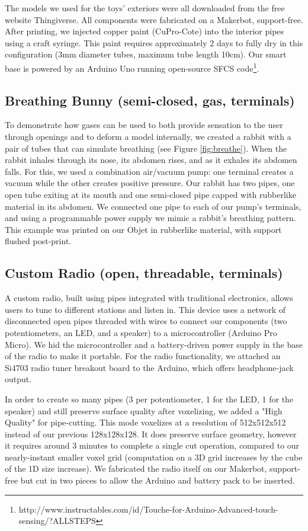 The models we used for the toys' exteriors were all downloaded from the free website Thingiverse.  All components were fabricated on a Makerbot, support-free.  After printing, we injected copper paint (CuPro-Cote) into the interior pipes using a craft syringe.  This paint requires approximately 2 days to fully dry in this configuration (3mm diameter tubes, maximum tube length 10cm).  Our smart base is powered by an Arduino Uno running open-source SFCS code\footnote{http://www.instructables.com/id/Touche-for-Arduino-Advanced-touch-sensing/?ALLSTEPS}.

\subsection{Breathing Bunny (semi-closed, gas, terminals)}

To demonstrate how gases can be used to both provide sensation to the user through openings and to deform a model internally, we created a rabbit with a pair of tubes that can simulate breathing (see Figure \ref{fig:breathe}).  When the rabbit inhales through its nose, its abdomen rises, and as it exhales its abdomen falls.  For this, we used a combination air/vacuum pump: one terminal creates a vacuum while the other creates positive pressure.  Our rabbit has two pipes, one open tube exiting at its mouth and one semi-closed pipe capped with rubberlike material in its abdomen.  We connected one pipe to each of our pump's terminals, and using a programmable power supply we mimic a rabbit's breathing pattern.  This example was printed on our Objet in rubberlike material, with support flushed post-print.

\subsection{Custom Radio (open, threadable, terminals)}

A custom radio, built using pipes integrated with traditional electronics, allows users to tune to different stations and listen in.  This device uses a network of disconnected open pipes threaded with wires to connect our components (two potentiometers, an LED, and a speaker) to a microcontroller (Arduino Pro Micro). We hid the microcontroller and a battery-driven power supply in the base of the radio to make it portable.  For the radio functionality, we attached an Si4703 radio tuner breakout board to the Arduino, which offers headphone-jack output.

In order to create so many pipes (3 per potentiometer, 1 for the LED, 1 for the speaker) and still preserve surface quality after voxelizing, we added a "High Quality" for pipe-cutting.  This mode voxelizes at a resolution of 512x512x512 instead of our previous 128x128x128.  It does preserve surface geometry, however it requires around 3 minutes to complete a single cut operation, compared to our nearly-instant smaller voxel grid (computation on a 3D grid increases by the cube of the 1D size increase).  We fabricated the radio itself on our Makerbot, support-free but cut in two pieces to allow the Arduino and battery pack to be inserted.

